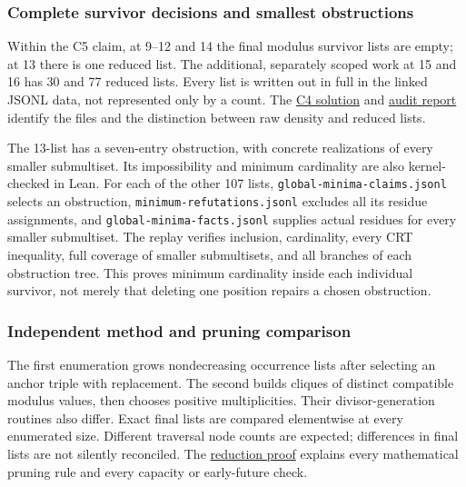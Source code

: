 \documentclass[11pt,a4paper]{article}
\begin{document}
\subsubsection{Complete survivor decisions and smallest obstructions}\label{complete-survivor-decisions-and-smallest-obstructions}

Within the C5 claim, at 9--12 and 14 the final modulus survivor lists are empty; at 13 there is one reduced list. The additional, separately scoped work at 15 and 16 has 30 and 77 reduced lists. Every list is written out in full in the linked JSONL data, not represented only by a count. The \href{https://github.com/mpelteshki/climbing-to-the-frontier/blob/ed55f76eb8c558825bb629fd2cd8dbf46e5f1314/cagent/p4/c4/solution.md}{C4 solution} and \href{https://github.com/mpelteshki/climbing-to-the-frontier/blob/ed55f76eb8c558825bb629fd2cd8dbf46e5f1314/cagent/p4/audit/REPORT.md}{audit report} identify the files and the distinction between raw density and reduced lists.

The 13-list has a seven-entry obstruction, with concrete realizations of every smaller submultiset. Its impossibility and minimum cardinality are also kernel-checked in Lean. For each of the other 107 lists, \texttt{global-minima-claims.jsonl} selects an obstruction, \texttt{minimum-refutations.jsonl} excludes all its residue assignments, and \texttt{global-minima-facts.jsonl} supplies actual residues for every smaller submultiset. The replay verifies inclusion, cardinality, every CRT inequality, full coverage of smaller submultisets, and all branches of each obstruction tree. This proves minimum cardinality inside each individual survivor, not merely that deleting one position repairs a chosen obstruction.

\subsubsection{Independent method and pruning comparison}\label{independent-method-and-pruning-comparison}

The first enumeration grows nondecreasing occurrence lists after selecting an anchor triple with replacement. The second builds cliques of distinct compatible modulus values, then chooses positive multiplicities. Their divisor-generation routines also differ. Exact final lists are compared elementwise at every enumerated size. Different traversal node counts are expected; differences in final lists are not silently reconciled. The \href{https://github.com/mpelteshki/climbing-to-the-frontier/blob/ed55f76eb8c558825bb629fd2cd8dbf46e5f1314/cagent/p4/audit/reduction-proof.md}{reduction proof} explains every mathematical pruning rule and every capacity or early-future check.
\end{document}
